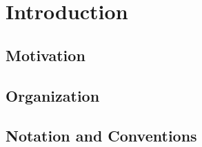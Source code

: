 \chapter{Introduction}
\label{ch:introduction}

  \section{Motivation}
  \label{sec:motivation}
  

  \section{Organization}
  \label{sec:organization}
  

  \section{Notation and Conventions}
  \label{sec:notation}
  
